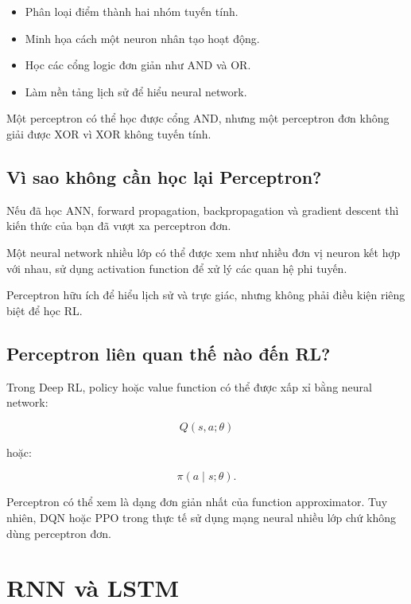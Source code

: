 \documentclass[12pt,a4paper]{report}
\begin{document}
\begin{itemize}[leftmargin=1.5em]
    \item Phân loại điểm thành hai nhóm tuyến tính.
    \item Minh họa cách một neuron nhân tạo hoạt động.
    \item Học các cổng logic đơn giản như AND và OR.
    \item Làm nền tảng lịch sử để hiểu neural network.
\end{itemize}

Một perceptron có thể học được cổng AND, nhưng một perceptron đơn không giải được XOR vì XOR không tuyến tính.

\subsection{Vì sao không cần học lại Perceptron?}

Nếu đã học ANN, forward propagation, backpropagation và gradient descent thì kiến thức của bạn đã vượt xa perceptron đơn.

Một neural network nhiều lớp có thể được xem như nhiều đơn vị neuron kết hợp với nhau, sử dụng activation function để xử lý các quan hệ phi tuyến.

Perceptron hữu ích để hiểu lịch sử và trực giác, nhưng không phải điều kiện riêng biệt để học RL.

\subsection{Perceptron liên quan thế nào đến RL?}

Trong Deep RL, policy hoặc value function có thể được xấp xỉ bằng neural network:

\begin{equation}
Q(s,a;\theta)
\end{equation}

hoặc:

\begin{equation}
\pi(a\mid s;\theta).
\end{equation}

Perceptron có thể xem là dạng đơn giản nhất của function approximator. Tuy nhiên, DQN hoặc PPO trong thực tế sử dụng mạng neural nhiều lớp chứ không dùng perceptron đơn.

\section{RNN và LSTM}
\end{document}
